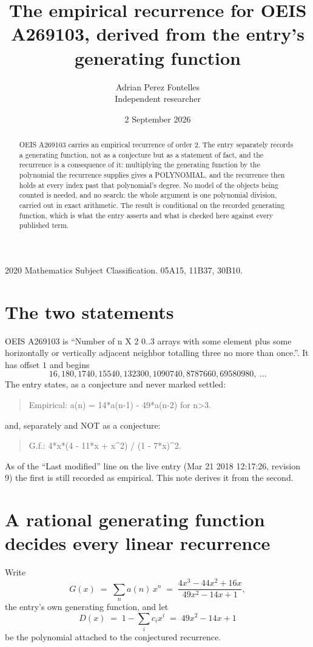 \documentclass[11pt,a4paper]{article}
\title{The empirical recurrence for OEIS A269103, derived from the entry's generating function}
\author{Adrian Perez Fontelles\\ \small Independent researcher}
\date{2 September 2026}
\theoremstyle{plain}
\theoremstyle{definition}
\begin{document}
\maketitle

\begin{abstract}
OEIS A269103 carries an empirical recurrence of order $2$. The entry separately records a
generating function, not as a conjecture but as a statement of fact, and the recurrence is a
consequence of it: multiplying the generating function by the polynomial the recurrence
supplies gives a POLYNOMIAL, and the recurrence then holds at every index past that
polynomial's degree. No model of the objects being counted is needed, and no search: the
whole argument is one polynomial division, carried out in exact arithmetic. The result is
conditional on the recorded generating function, which is what the entry asserts and what is
checked here against every published term.
\end{abstract}

\noindent\small 2020 Mathematics Subject Classification. 05A15, 11B37, 30B10.\normalsize

\section{The two statements}

OEIS A269103 is ``Number of n X 2 0..3 arrays with some element plus some horizontally or vertically adjacent neighbor totalling three no more than once.''. It has offset $1$ and begins
\[
16, 180, 1740, 15540, 132300, 1090740, 8787660, 69580980,\ \dots
\]
The entry states, as a conjecture and never marked settled:
\begin{quote}
Empirical: a(n) = 14*a(n-1) - 49*a(n-2) for n>3.
\end{quote}
and, separately and NOT as a conjecture:
\begin{quote}
G.f.: 4*x*(4 - 11*x + x\^{}2) / (1 - 7*x)\^{}2.
\end{quote}
As of the ``Last modified'' line on the live entry (Mar 21 2018 12:17:26, revision 9) the first is still
recorded as empirical. This note derives it from the second.

\section{A rational generating function decides every linear recurrence}

Write
\[
G(x)\;=\;\sum_{n}a(n)\,x^{n}\;=\;\frac{4 x^{3} - 44 x^{2} + 16 x}{49 x^{2} - 14 x + 1},
\]
the entry's own generating function, and let
\[
D(x)\;=\;1-\sum_i c_i x^{i}\;=\;49 x^{2} - 14 x + 1
\]
be the polynomial attached to the conjectured recurrence.
\end{document}
